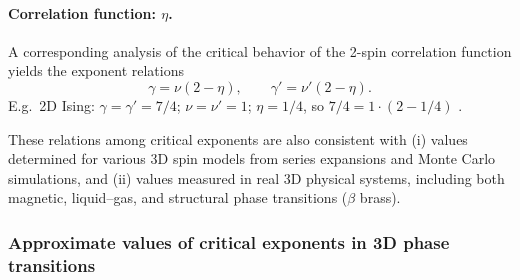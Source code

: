 \paragraph{Correlation function: $\eta$.} A corresponding analysis of the critical behavior of the 2-spin
correlation function yields the exponent relations
\begin{equation}
  \boxed{\gamma = \nu(2-\eta),\qquad \gamma' = \nu'(2-\eta)}.
\end{equation}
E.g.\ 2D Ising: $\gamma = \gamma' = 7/4$; $\nu = \nu' = 1$; $\eta = 1/4$, so
$7/4 = 1\cdot(2-1/4)$ \checkmark.

These relations among critical exponents are also consistent with (i) values determined for various 3D
spin models from series expansions and Monte Carlo simulations, and (ii) values measured in real 3D
physical systems, including both magnetic, liquid--gas, and structural phase transitions ($\beta$ brass).

\subsubsection*{Approximate values of critical exponents in 3D phase transitions}

